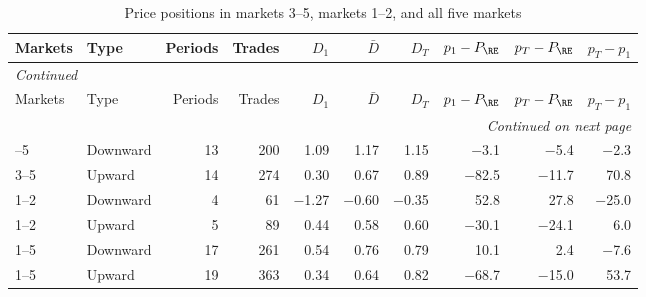 \scriptsize
\begin{longtable}{llrrrrrrrr}
\caption{Price positions in markets 3--5, markets 1--2, and all five markets}\label{tab:app-human-five}\\
\toprule
Markets & Type & Periods & Trades & $D_1$ & $\bar D$ & $D_T$ & $p_1-P_{\RE}$ & $p_T-P_{\RE}$ & $p_T-p_1$ \\
\midrule
\endfirsthead
\multicolumn{10}{l}{\textit{Continued}}\\
\toprule
Markets & Type & Periods & Trades & $D_1$ & $\bar D$ & $D_T$ & $p_1-P_{\RE}$ & $p_T-P_{\RE}$ & $p_T-p_1$ \\
\midrule
\endhead
\midrule
\multicolumn{10}{r}{\textit{Continued on next page}}\\
\endfoot
\bottomrule
\endlastfoot
3--5 & Downward & 13 & 200 & 1.09 & 1.17 & 1.15 & $-$3.1 & $-$5.4 & $-$2.3 \\
3--5 & Upward & 14 & 274 & 0.30 & 0.67 & 0.89 & $-$82.5 & $-$11.7 & 70.8 \\
1--2 & Downward & 4 & 61 & $-$1.27 & $-$0.60 & $-$0.35 & 52.8 & 27.8 & $-$25.0 \\
1--2 & Upward & 5 & 89 & 0.44 & 0.58 & 0.60 & $-$30.1 & $-$24.1 & 6.0 \\
1--5 & Downward & 17 & 261 & 0.54 & 0.76 & 0.79 & 10.1 & 2.4 & $-$7.6 \\
1--5 & Upward & 19 & 363 & 0.34 & 0.64 & 0.82 & $-$68.7 & $-$15.0 & 53.7 \\
\end{longtable}
